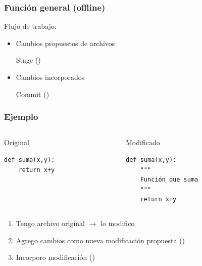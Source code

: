 \documentclass[14pt,aspectratio=169,xcolor=dvipsnames]{beamer}
\begin{document}
\begin{frame}\frametitle{Función general (offline)}
    Flujo de trabajo:
    \begin{itemize}
        \item Cambios propuestos de archivos \phantom{ }
            
            \begin{minipage}{0.35\textwidth}
            \begin{block}{}
                Stage \hfill()
            \end{block}
            \end{minipage}
        \item Cambios incorporados \phantom{ }

            \begin{minipage}{0.35\textwidth}
            \begin{block}{}
                Commit \hfill()
            \end{block}
            \end{minipage}
    \end{itemize}
\end{frame}
\begin{frame}[t,fragile]\frametitle{Ejemplo}
  \begin{columns}
    \begin{column}[t]{0.45\textwidth}
        Original
        \begin{verbatim}
def suma(x,y):
    return x+y
        \end{verbatim}
    \end{column}
    \begin{column}[t]{0.45\textwidth}
        Modificado
        \begin{verbatim}
def suma(x,y):
    """
    Función que suma
    """
    return x+y
        \end{verbatim}
    \end{column}
  \end{columns}
    
\begin{enumerate}
    \item Tengo archivo original $\to$ lo modifico
    \item Agrego cambios como nueva modificación propuesta \hfill ()
    \item Incorporo modificación \hfill ()
\end{enumerate}
\end{frame}
\end{document}
